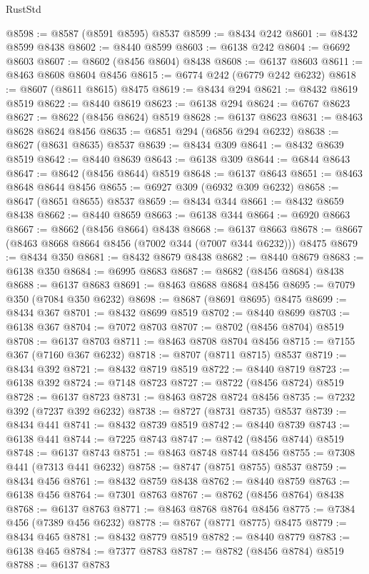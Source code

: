 \begin{lexlean}{RustStd}
\begin{coremodule}
{{@8598 := @8587 (@8591 @8595) @8537
@8599 := @8434 @242
@8601 := @8432 @8599 @8438
@8602 := @8440 @8599
@8603 := @6138 @242
@8604 := @6692 @8603
@8607 := @8602 (@8456 @8604) @8438
@8608 := @6137 @8603
@8611 := @8463 @8608 @8604 @8456
@8615 := @6774 @242 (@6779 @242 @6232)
@8618 := @8607 (@8611 @8615) @8475
@8619 := @8434 @294
@8621 := @8432 @8619 @8519
@8622 := @8440 @8619
@8623 := @6138 @294
@8624 := @6767 @8623
@8627 := @8622 (@8456 @8624) @8519
@8628 := @6137 @8623
@8631 := @8463 @8628 @8624 @8456
@8635 := @6851 @294 (@6856 @294 @6232)
@8638 := @8627 (@8631 @8635) @8537
@8639 := @8434 @309
@8641 := @8432 @8639 @8519
@8642 := @8440 @8639
@8643 := @6138 @309
@8644 := @6844 @8643
@8647 := @8642 (@8456 @8644) @8519
@8648 := @6137 @8643
@8651 := @8463 @8648 @8644 @8456
@8655 := @6927 @309 (@6932 @309 @6232)
@8658 := @8647 (@8651 @8655) @8537
@8659 := @8434 @344
@8661 := @8432 @8659 @8438
@8662 := @8440 @8659
@8663 := @6138 @344
@8664 := @6920 @8663
@8667 := @8662 (@8456 @8664) @8438
@8668 := @6137 @8663
@8678 := @8667 (@8463 @8668 @8664 @8456 (@7002 @344 (@7007 @344 @6232))) @8475
@8679 := @8434 @350
@8681 := @8432 @8679 @8438
@8682 := @8440 @8679
@8683 := @6138 @350
@8684 := @6995 @8683
@8687 := @8682 (@8456 @8684) @8438
@8688 := @6137 @8683
@8691 := @8463 @8688 @8684 @8456
@8695 := @7079 @350 (@7084 @350 @6232)
@8698 := @8687 (@8691 @8695) @8475
@8699 := @8434 @367
@8701 := @8432 @8699 @8519
@8702 := @8440 @8699
@8703 := @6138 @367
@8704 := @7072 @8703
@8707 := @8702 (@8456 @8704) @8519
@8708 := @6137 @8703
@8711 := @8463 @8708 @8704 @8456
@8715 := @7155 @367 (@7160 @367 @6232)
@8718 := @8707 (@8711 @8715) @8537
@8719 := @8434 @392
@8721 := @8432 @8719 @8519
@8722 := @8440 @8719
@8723 := @6138 @392
@8724 := @7148 @8723
@8727 := @8722 (@8456 @8724) @8519
@8728 := @6137 @8723
@8731 := @8463 @8728 @8724 @8456
@8735 := @7232 @392 (@7237 @392 @6232)
@8738 := @8727 (@8731 @8735) @8537
@8739 := @8434 @441
@8741 := @8432 @8739 @8519
@8742 := @8440 @8739
@8743 := @6138 @441
@8744 := @7225 @8743
@8747 := @8742 (@8456 @8744) @8519
@8748 := @6137 @8743
@8751 := @8463 @8748 @8744 @8456
@8755 := @7308 @441 (@7313 @441 @6232)
@8758 := @8747 (@8751 @8755) @8537
@8759 := @8434 @456
@8761 := @8432 @8759 @8438
@8762 := @8440 @8759
@8763 := @6138 @456
@8764 := @7301 @8763
@8767 := @8762 (@8456 @8764) @8438
@8768 := @6137 @8763
@8771 := @8463 @8768 @8764 @8456
@8775 := @7384 @456 (@7389 @456 @6232)
@8778 := @8767 (@8771 @8775) @8475
@8779 := @8434 @465
@8781 := @8432 @8779 @8519
@8782 := @8440 @8779
@8783 := @6138 @465
@8784 := @7377 @8783
@8787 := @8782 (@8456 @8784) @8519
@8788 := @6137 @8783
}}
\end{coremodule}
\end{lexlean}
